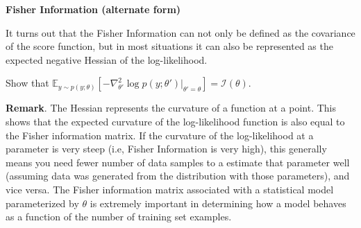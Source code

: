 \ifnum{} {
  \clearpage
} \fi
\item {} \textbf{Fisher Information (alternate form)}

It turns out that the Fisher Information can not only be defined as the covariance of the score function,
but in most situations it can also be represented as the expected negative Hessian of the log-likelihood.

Show that $\mathbb{E}_{y\sim p(y;\theta)}[-\nabla^2_{\theta'} \log p(y;\theta')|_{\theta'=\theta}]=\mathcal{I}(\theta)$.

\ifnum{} {
  
} \fi

\textbf{Remark}. The Hessian represents the curvature of a function at a point. This shows that the expected curvature of the log-likelihood function is also equal to the Fisher information matrix. If the curvature of the log-likelihood at a parameter is very steep (i.e, Fisher Information is very high), this generally means you need fewer number of data samples to a estimate that parameter well (assuming data was generated from the distribution with those parameters), and vice versa. The Fisher information matrix associated with a statistical model parameterized by $\theta$ is extremely important in determining how a model behaves as a function of the number of training set examples.
